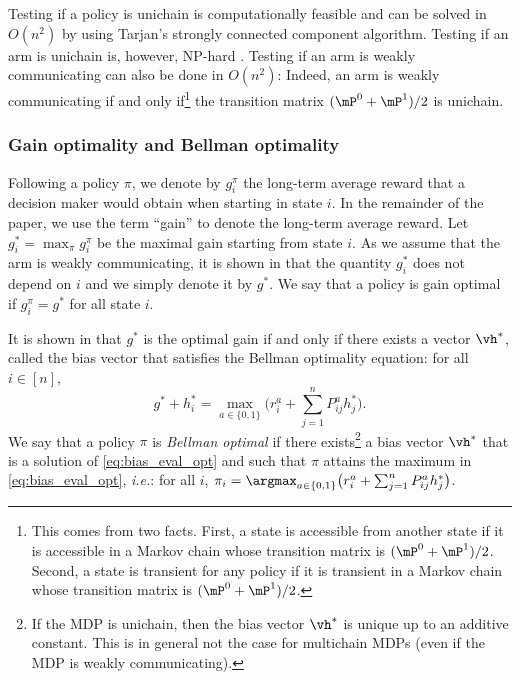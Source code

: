Testing if a policy is unichain is computationally feasible and can be solved in $O(n^2)$ by using Tarjan's strongly connected component algorithm. Testing if an arm is unichain is, however, NP-hard \cite{tsitsiklis2007np}. Testing if an arm is weakly communicating can also be done in $O(n^2)$: Indeed, an arm is weakly communicating if and only if\footnote{This comes from two facts. First, a state is accessible from another state if it is accessible in a Markov chain whose transition matrix is $(\mP^0 +\mP^1)/2$. Second, a state is transient for any policy if it is transient in a Markov chain whose transition matrix is $(\mP^0 +\mP^1)/2$.} the transition matrix $(\mP^0 +\mP^1)/2$ is unichain.

\subsubsection{Gain optimality and Bellman optimality}
\label{ssec:bellman_optimal}

Following a policy $\pi$, we denote by $g^\pi_i$ the long-term average reward that a decision maker would obtain when starting in state $i$. In the remainder of the paper, we use the term ``gain'' to denote the long-term average reward. Let $g^*_i=\max_\pi g^\pi_i$ be the maximal gain starting from state $i$.  As we assume that the arm is weakly communicating, it is shown in \cite[Chapter 8]{puterman2014markov} that the quantity $g^*_i$ does not depend on $i$ and we simply denote it by $g^*$.  We say that a policy is gain optimal if $g^\pi_i=g^*$ for all state $i$.

It is shown in \cite[Chapter 8]{puterman2014markov} that $g^*$ is the optimal gain if and only if there exists a vector $\vh^*$, called the bias vector that satisfies the Bellman optimality equation:  for all $i\in[n]$,
\begin{equation}
    g^* + h^*_i = \max_{a\in\{0,1\}} \Big( r^{a}_i + \sum_{j=1}^n P^{a}_{ij}h^*_j \Big).  \label{eq:bias_eval_opt}
\end{equation}
We say that a policy  $\pi$ is \emph{Bellman optimal} if there exists\footnote{If the MDP is unichain, then the bias vector $\vh^*$ is unique up to an additive constant.  This is in general not the case for multichain MDPs (even if the MDP is weakly communicating).
} a bias vector $\vh^*$ that is a solution of \eqref{eq:bias_eval_opt} and such that $\pi$ attains the maximum in \eqref{eq:bias_eval_opt}, \emph{i.e.}: for all $i$, ${\pi_i=\argmax_{a\in\{0,1\}} \big(r^{a}_i + \sum_{j=1}^n P^{a}_{ij}h^*_j\big)}$.

